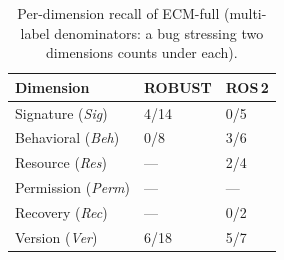 \begin{table}[!ht]\centering
\caption{Per-dimension recall of ECM-full (multi-label denominators: a bug stressing two dimensions counts under each).}
\label{tab:pathb_perdim}\small
\begin{tabularx}{\linewidth}{@{}lXX@{}}\toprule
\textbf{Dimension} & \textbf{ROBUST} & \textbf{ROS\,2} \\\midrule
Signature (\textit{Sig}) & 4/14 & 0/5 \\
Behavioral (\textit{Beh}) & 0/8 & 3/6 \\
Resource (\textit{Res}) & --- & 2/4 \\
Permission (\textit{Perm}) & --- & --- \\
Recovery (\textit{Rec}) & --- & 0/2 \\
Version (\textit{Ver}) & 6/18 & 5/7 \\
\bottomrule\end{tabularx}\end{table}